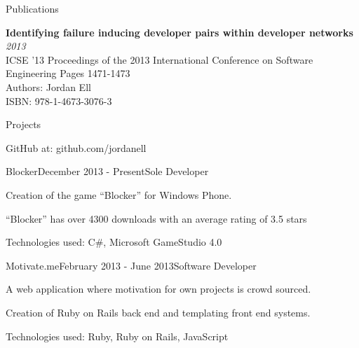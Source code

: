 \documentclass{resume} %
\begin{document}

\begin{rSection}{Publications}

{\bf Identifying failure inducing developer pairs within developer networks} \hfill {\em2013} \\
ICSE '13 Proceedings of the 2013 International Conference on Software Engineering Pages 1471-1473 \\
Authors: Jordan Ell \\
ISBN: 978-1-4673-3076-3

\end{rSection}


\begin{rSection}{Projects}

GitHub at: github.com/jordanell

\begin{rSubsection}{Blocker}{December 2013 - Present}{Sole Developer}{}
\item Creation of the game ``Blocker'' for Windows Phone.
\item ``Blocker'' has over 4300 downloads with an average rating of 3.5 stars
\item Technologies used: C\#, Microsoft GameStudio 4.0
\end{rSubsection}

\begin{rSubsection}{Motivate.me}{February 2013 - June 2013}{Software Developer}{}
\item A web application where motivation for own projects is crowd sourced.
\item Creation of Ruby on Rails back end and templating front end systems.
\item Technologies used: Ruby, Ruby on Rails, JavaScript
\end{rSubsection}

\end{rSection}

\end{document}
